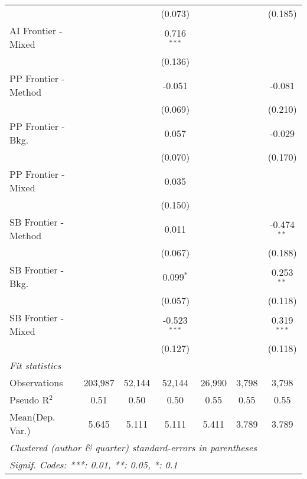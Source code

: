\begin{tabular}{lcccccc}
                        &               &         & (0.073)        &              &         & (0.185)\\   
   AI Frontier - Mixed  &               &         & 0.716$^{***}$  &              &         &   \\   
                        &               &         & (0.136)        &              &         &   \\   
   PP Frontier - Method &               &         & -0.051         &              &         & -0.081\\   
                        &               &         & (0.069)        &              &         & (0.210)\\   
   PP Frontier - Bkg.   &               &         & 0.057          &              &         & -0.029\\   
                        &               &         & (0.070)        &              &         & (0.170)\\   
   PP Frontier - Mixed  &               &         & 0.035          &              &         &   \\   
                        &               &         & (0.150)        &              &         &   \\   
   SB Frontier - Method &               &         & 0.011          &              &         & -0.474$^{**}$\\   
                        &               &         & (0.067)        &              &         & (0.188)\\   
   SB Frontier - Bkg.   &               &         & 0.099$^{*}$    &              &         & 0.253$^{**}$\\   
                        &               &         & (0.057)        &              &         & (0.118)\\   
   SB Frontier - Mixed  &               &         & -0.523$^{***}$ &              &         & 0.319$^{***}$\\   
                        &               &         & (0.127)        &              &         & (0.118)\\   
   \midrule
   \emph{Fit statistics}\\
   Observations         & 203,987       & 52,144  & 52,144         & 26,990       & 3,798   & 3,798\\  
   Pseudo R$^2$         & 0.51          & 0.50    & 0.50           & 0.55         & 0.55    & 0.55\\  
Mean(Dep. Var.) & 5.645 & 5.111 & 5.111 & 5.411 & 3.789 & 3.789 \\
   \midrule \midrule
   \multicolumn{7}{l}{\emph{Clustered (author \& quarter) standard-errors in parentheses}}\\
   \multicolumn{7}{l}{\emph{Signif. Codes: ***: 0.01, **: 0.05, *: 0.1}}\\
\end{tabular}
\par\endgroup
